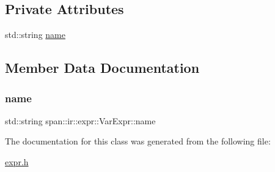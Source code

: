 \subsection*{Private Attributes}
\begin{DoxyCompactItemize}
\item 
std\+::string \hyperlink{classspan_1_1ir_1_1expr_1_1VarExpr_a03e1f8d576b09c4745e093bf464d0347}{name}
\end{DoxyCompactItemize}


\subsection{Member Data Documentation}
\mbox{\label{classspan_1_1ir_1_1expr_1_1VarExpr_a03e1f8d576b09c4745e093bf464d0347}} 
\subsubsection{\texorpdfstring{name}{name}}
{\footnotesize\ttfamily std\+::string span\+::ir\+::expr\+::\+Var\+Expr\+::name\hspace{0.3cm}{\ttfamily [private]}}



The documentation for this class was generated from the following file\+:\begin{DoxyCompactItemize}
\item 
\hyperlink{expr_8h}{expr.\+h}\end{DoxyCompactItemize}
